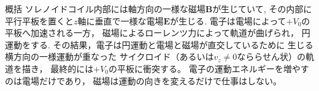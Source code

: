 \documentclass[a4paper,12pt]{jlreq}
\begin{document}
\begin{itembox}[l]{概括}
ソレノイドコイル内部には軸方向の一様な磁場$\bm{B}$が生じていて, 
その内部に平行平板を置くと$z$軸に垂直で一様な電場$\bm{E}$が生じる.
電子は電場によって$+V_0$の平板へ加速される一方，
磁場によるローレンツ力によって軌道が曲げられ，
円運動をする.
その結果，電子は円運動と電場と磁場が直交しているために
生じる横方向の一様運動が重なった
サイクロイド（あるいは$v_z\neq 0$なららせん状）の軌道を描き，
最終的には$+V_0$の平板に衝突する。
電子の運動エネルギーを増やすのは電場だけであり，
磁場は運動の向きを変えるだけで仕事はしない。

\end{itembox}
\end{document}
